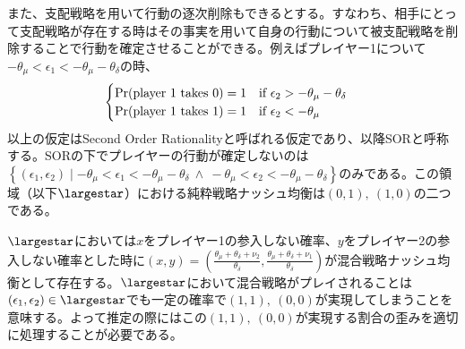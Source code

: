 \documentclass{jsarticle}
\begin{document}
また、支配戦略を用いて行動の逐次削除もできるとする。すなわち、相手にとって支配戦略が存在する時はその事実を用いて自身の行動について被支配戦略を削除することで行動を確定させることができる。例えばプレイヤー1について$-\theta_{\mu} < \epsilon_1 < -\theta_{\mu} - \theta_{\delta}$の時、
\begin{align*}
	\begin{cases}
		{\rm Pr}(\text{player 1 takes $0$}) = 1\quad \text{if}\ \epsilon_2 > -\theta_{\mu} - \theta_{\delta}\\
		{\rm Pr}(\text{player 1 takes $1$}) = 1\quad \text{if}\ \epsilon_2 < -\theta_{\mu}
	\end{cases}
\end{align*}
以上の仮定はSecond Order Rationalityと呼ばれる仮定であり、以降SORと呼称する。SORの下でプレイヤーの行動が確定しないのは$\left\{ (\epsilon_1, \epsilon_2) \mid -\theta_{\mu} < \epsilon_1 < -\theta_{\mu} - \theta_{\delta}\ \wedge\  -\theta_{\mu} < \epsilon_2 < -\theta_{\mu} - \theta_{\delta} \right\}$のみである。この領域（以下$\largestar$）における純粋戦略ナッシュ均衡は$(0,1),\ (1,0)$の二つである。

$\largestar$においては$x$をプレイヤー1の参入しない確率、$y$をプレイヤー2の参入しない確率とした時に$(x, y) = \left( \frac{\theta_{\mu} + \theta_{\delta} + \nu_2}{\theta_{\delta}} ,  \frac{\theta_{\mu} + \theta_{\delta} + \nu_1}{\theta_{\delta}} \right)$が混合戦略ナッシュ均衡として存在する。$\largestar$において混合戦略がプレイされることは$(\epsilon_1, \epsilon_2) \in \largestar$でも一定の確率で$(1,1),\ (0,0)$が実現してしまうことを意味する。よって推定の際にはこの$(1,1),\ (0,0)$が実現する割合の歪みを適切に処理することが必要である。
\end{document}
